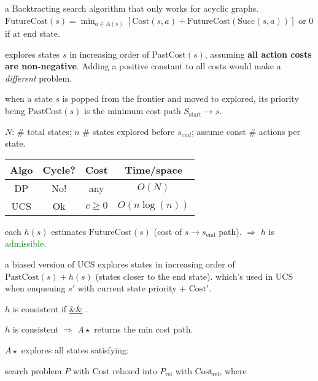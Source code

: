  a Backtracting search algorithm that only works
for acyclic graphs.
$\text{FutureCost}(s) = \min_{a\in A(s)}\left[\text{Cost}(s,a) + \text{FutureCost}(\text{Succ}(s,a))\right]$
or $0$ if at end state.

 explores states $s$ in increasing order of
PastCost$(s)$, assuming \textbf{all action costs are non-negative}. Adding a
positive constant to all costs would make a \emph{different} problem.

 when a state $s$ is popped from the frontier and moved
to explored, its priority being $\text{PastCost}(s)$ is the minimum cost path
$S_\text{start} \rightarrow s$.

 $N$: \# total states; $n$ \# states explored before $s_{end}$;
assume const \# actions per state.

\begin{tabular}{|c|c|c|c|} 
    \hline
    \textbf{Algo} & \textbf{Cycle?} & \textbf{Cost} & \textbf{Time/space} \\
    \hline
    DP & No! & any & $O(N)$ \\ 
    \hline
    UCS & Ok & $c \ge 0$ & $O(n \log(n))$ \\
    \hline
\end{tabular}

 each $h(s)$ estimates $\text{FutureCost}(s)$ (cost of $s
\rightarrow s_{\text{end}}$ path).  $\Rightarrow$
$h$ is \textcolor{Green}{admissible}.

 a biased version of UCS explores states in increasing
order of $\text{PastCost}(s) + h(s)$ (states closer to the end state).
which's used in UCS when enqueuing $s'$ with current state priority +
$\text{Cost}'$.

 $h$ is consistent if
 \underline{\&\&}
.
 

 $h$ is consistent $\Rightarrow$ $A\star$ returns the min cost path.

 $A\star$ explores all states satisfying:

 search problem $P$ with $\text{Cost}$ relaxed
into $P_\text{rel}$ with $\text{Cost}_\text{rel}$, where

